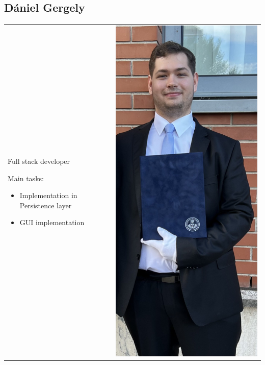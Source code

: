 \documentclass{article}
\begin{document}
\subsection{Dániel Gergely}
    \begin{tabular}{@{}p{}@{} p{}@{}}
    Full stack developer
    
    Main tasks:
    \begin{itemize}
        \item Implementation in Persistence layer
        \item GUI implementation
    \end{itemize}
    &
    \includegraphics[width=\linewidth]{img/Daniel_Gergely.jpg}
    \end{tabular}
\end{document}
